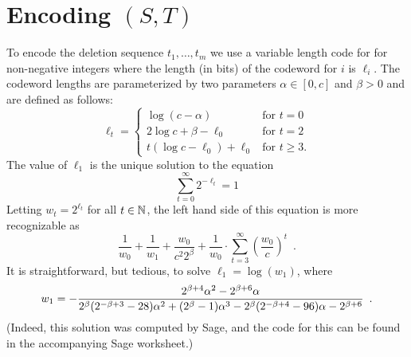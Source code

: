 \documentclass{patmorin}
\begin{document}
\section{Encoding $(S,T)$}

To encode the deletion sequence $t_1,\ldots,t_m$ we use a variable length code for for non-negative integers where the length (in bits) of the codeword for $i$ is $\ell_i$.  The codeword lengths are parameterized by two parameters $\alpha\in[0,c]$ and $\beta>0$ and are defined as follows:
\[
   \ell_t = \begin{cases} 
      \log(c-\alpha) & \text{for $t=0$} \\
      2\log c+\beta-\ell_0 & \text{for $t=2$} \\
      t(\log c - \ell_0) + \ell_0 & \text{for $t\ge 3$.}
    \end{cases}
\]
The value of $\ell_1$ is the unique solution to the equation
\[
    \sum_{t=0}^\infty 2^{-\ell_t} = 1
\]
Letting $w_t=2^{\ell_t}$ for all $t\in\mathbb{N}$, the left hand side of this equation is more recognizable as
\[
   \frac{1}{w_0} + \frac{1}{w_1} + \frac{w_0}{c^2 2^\beta} + \frac{1}{w_0}\cdot\sum_{t=3}^\infty\left(\frac{w_0}{c}\right)^t \enspace .
\]
It is straightforward, but tedious, to solve $\ell_1=\log(w_1)$, where
\begin{equation}
  w_{1} = -\frac{2^{\beta + 4} \alpha^{2} - 2^{\beta + 6} \alpha}{2^{\beta} {\left(2^{-\beta + 3} - 28\right)} \alpha^{2} + {\left(2^{\beta} - 1\right)} \alpha^{3} - 2^{\beta} {\left(2^{-\beta + 4} - 96\right)} \alpha - 2^{\beta + 6}} \enspace .  \eqlabel{w1}
\end{equation}
(Indeed, this solution was computed by Sage, and the code for this can be found in the accompanying Sage worksheet.)
\end{document}

